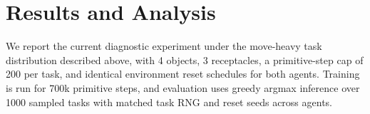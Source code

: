 \documentclass[10pt]{article} %
\begin{document}



\section{Results and Analysis}
\label{sec:results}

We report the current diagnostic experiment under the move-heavy task distribution described above, with 4 objects, 3 receptacles, a primitive-step cap of 200 per task, and identical environment reset schedules for both agents. Training is run for 700k primitive steps, and evaluation uses greedy argmax inference over 1000 sampled tasks with matched task RNG and reset seeds across agents.
\end{document}

